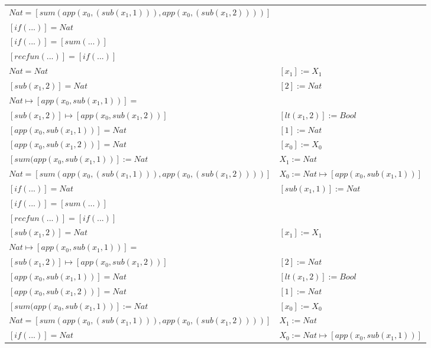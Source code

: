 \begin{exercise}
\begin{description}
\begin{center}
\begin{longtable}{ | l | l | }
                        $Nat = [sum(app(x_0, (sub(x_1,1))), app(x_0, (sub(x_1,2))))]$ & \\
                        $[if(...)] = Nat$ & \\
                        $[if(...)] = [sum(...)]$ & \\
                        $[recfun(...)] = [if(...)]$ & \\
                    \hline
                        $Nat = Nat$ &  $[x_1] := X_1$ \\
                        $[sub(x_1,2)] = Nat$ & $[2] := Nat$  \\
                        $Nat \mapsto [app(x_0, sub(x_1,1))] = $ & \\
			     $[sub(x_1,2)] \mapsto [app(x_0, sub(x_1,2))]$ & $[lt(x_1 , 2)] := Bool$  \\
                        $[app(x_0, sub(x_1,1))] = Nat$ &  $[1] := Nat$  \\
                        $[app(x_0, sub(x_1,2))] = Nat$ & $[x_0] := X_0$  \\
                        $[sum(app(x_0, sub(x_1,1))] := Nat$ &  $X_1 := Nat$ \\
                        $Nat = [sum(app(x_0, (sub(x_1,1))), app(x_0, (sub(x_1,2))))]$ & $X_0 := Nat \mapsto [app(x_0, sub(x_1,1))]$ \\
                        $[if(...)] = Nat$ &   $[sub(x_1,1)] := Nat$ \\
                        $[if(...)] = [sum(...)]$ & \\
                        $[recfun(...)] = [if(...)]$ & \\
                    \hline
                        $[sub(x_1,2)] = Nat$ & $[x_1] := X_1$  \\
                        $Nat \mapsto [app(x_0, sub(x_1,1))] =$ & \\ 
			     $[sub(x_1,2)] \mapsto [app(x_0, sub(x_1,2))]$ & $[2] := Nat$ \\
                        $[app(x_0, sub(x_1,1))] = Nat$ & $[lt(x_1 , 2)] := Bool$\\
                        $[app(x_0, sub(x_1,2))] = Nat$ &  $[1] := Nat$\\
                        $[sum(app(x_0, sub(x_1,1))] := Nat$ & $[x_0] := X_0$\\
                        $Nat = [sum(app(x_0, (sub(x_1,1))), app(x_0, (sub(x_1,2))))]$ & $X_1 := Nat$\\
                        $[if(...)] = Nat$ & $X_0 := Nat \mapsto [app(x_0, sub(x_1,1))]$\\

\end{longtable}
\end{center}
\end{description}
\end{exercise}
